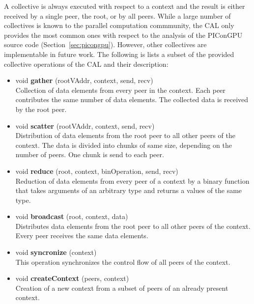A collective is always executed with respect to a context and the
result is either received by a single peer, the root, or by all peers.
While a large number of collectives is known to the parallel
computation commmunity, the CAL only provides the most common ones
with respect to the analysis of the PIConGPU source code
(Section~\ref{sec:picongpu}).  However, other collectives are
implementable in future work. The following is lists a subset of the
provided collective operations of the CAL and their description:


\begin{itemize}
\item  void \textbf{gather} (rootVAddr, context, send, recv)\\
  Collection of data elements from every peer in the context. Each
  peer contributes the same number of data elements. The collected
  data is received by the root peer.


\item  void \textbf{scatter} (rootVAddr, context, send, recv)\\
  Distribution of data elements from the root peer to all other peers of
  the context. The data is divided into chunks of same
  size, depending on the number of peers. One chunk is send to each peer.


\item  void \textbf{reduce} (root, context, binOperation, send, recv)\\
  Reduction of data elements from every peer of a context
  by a binary function that takes arguments of an arbitrary type
  and returns a values of the same type.


\item  void \textbf{broadcast} (root, context, data)\\
  Distributes data elements from the root peer to all other peers of
  the context. Every peer receives the same data elements.

\item  void \textbf{syncronize} (context)\\
  This operation synchronizes the control flow of all peers of the
  context.

\item  void \textbf{createContext} (peers, context)\\ 
  Creation of a new context from a subset of peers of an already
  present context.

\end{itemize}

